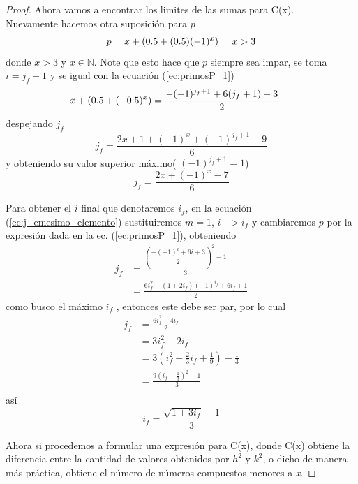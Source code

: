 \documentclass[10pt,letterpaper]{article}
\begin{document}
\begin{proof}
Ahora vamos a encontrar los limites de las sumas para C(x). \\
Nuevamente hacemos otra suposición para $p$
\begin{equation*}
	p =  x + (0.5 + (0.5)(-1)^x) \hspace{5mm} x > 3
\end{equation*}
donde $ x > 3$ y $x \in \mathbb{N}$. Note que esto hace que $p$ siempre sea impar, se toma $i = j_f  + 1$ y se igual con la ecuación (\ref{ec:primosP_1})
\begin{equation*}
x + (0.5 + (-0.5)^x) = \frac{-(-1)^{j_f  +1} + 6(j_f  + 1) + 3}{2} \hspace{5mm}
\end{equation*}
despejando $j_f$  
\begin{equation*}
	j_f = \frac{2x + 1 + (-1)^x +(-1)^{j_f  +1} - 9}{6} 
\end{equation*}
y obteniendo su valor superior máximo( $(-1)^{j_f  +1} = 1$)
\begin{equation*}
	j_f = \frac{2x  + (-1)^x  - 7}{6} 
\end{equation*}

\noindent Para obtener el $i$ final que denotaremos $i_f$, en la ecuación (\ref{ec:j_emesimo_elemento}) sustituiremos $m = 1$, $i -> i_f$ y cambiaremos $p$ por la expresión dada en la ec. (\ref{ec:primosP_1}), obteniendo
\begin{align*}
	j_f &= \frac{\left(\dfrac{-(-1)^i + 6i + 3}{2}\right)^2 - 1 }{3} \\
	&= \frac{6i_f^2 - (1 + 2i_f)(-1)^{i_f} + 6i_f + 1}{2}
\end{align*} 
como busco el máximo $i_f$ , entonces este debe ser par, por lo cual
\begin{align*}
	j_f &=\frac{6i_f^2 - 4i_f }{2}\\
	   &= 3i_f^2 - 2i_f \\
	   &= 3\left(i_f^2 + \frac{2}{3}i_f + \frac{1}{9}\right) - \frac{1}{3} \\ 
	   &=\frac{ 9\left(i_f +  \frac{1}{3}\right)^2 - 1 }{3} \\ 
\end{align*}
así
\begin{equation}
	i_f = \frac{\sqrt{1 + 3i_f} - 1}{3}
\end{equation}


Ahora si procedemos a formular una expresión para C(x), donde C(x) obtiene  la diferencia entre la cantidad de valores obtenidos por $h^2$ y $k^2$, o dicho de manera más práctica, obtiene el número de números compuestos menores a \textit{x}.  


\end{proof}
\end{document}
